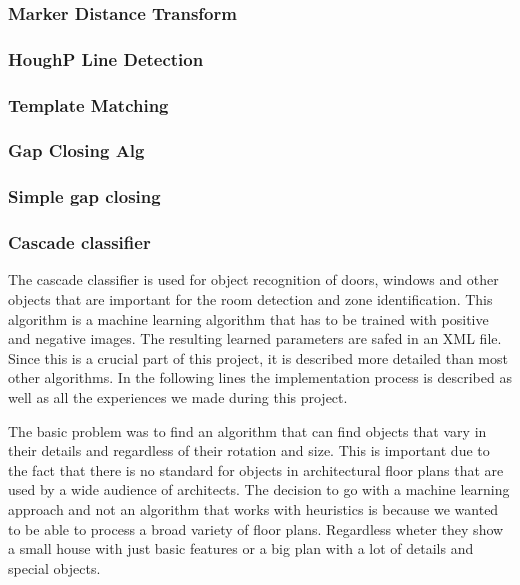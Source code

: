 \subsubsection{Marker Distance Transform}
\subsubsection{HoughP Line Detection}
\subsubsection{Template Matching}
\subsubsection{Gap Closing Alg}
\subsubsection{Simple gap closing}
\subsubsection{Cascade classifier}
The cascade classifier is used for object recognition of doors, windows and other objects that are important for the room detection and zone identification. This algorithm is a machine learning algorithm that has to be trained with positive and negative images. The resulting learned parameters are safed in an XML file. Since this is a crucial part of this project, it is described more detailed than most other algorithms. In the following lines the implementation process is described as well as all the experiences we made during this project.

The basic problem was to find an algorithm that can find objects that vary in their details and regardless of their rotation and size. This is important due to the fact that there is no standard for objects in architectural floor plans that are used by a wide audience of architects. The decision to go with a machine learning approach and not an algorithm that works with heuristics is because we wanted to be able to process a broad variety of floor plans. Regardless wheter they show a small house with just basic features or a big plan with a lot of details and special objects.




